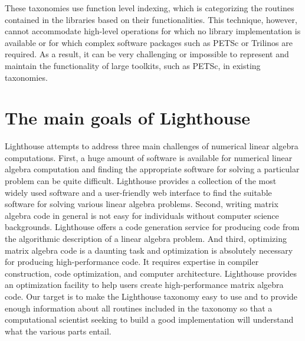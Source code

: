 These taxonomies use function level indexing, which is categorizing the routines contained in the libraries based on their functionalities. This technique, however, cannot accommodate high-level operations for which no library implementation is available or for which complex software packages such as PETSc \cite{petsc} or Trilinos \cite{trilinos} are required. As a result, it can be very challenging or impossible to represent and maintain the functionality of large toolkits, such as PETSc, in existing taxonomies.

\section{The main goals of Lighthouse}
Lighthouse attempts to address three main challenges of numerical linear algebra computations. First, a huge amount of software is available for numerical linear algebra computation and finding the appropriate software for solving a particular problem can be quite difficult. Lighthouse provides a collection of the most widely used software and a user-friendly web interface to find the suitable software for solving various linear algebra problems. Second, writing matrix algebra code in general is not easy for individuals without computer science backgrounds. Lighthouse offers a code generation service for producing code from the algorithmic description of a linear algebra problem. And third, optimizing matrix algebra code is a daunting task and optimization is absolutely necessary for producing high-performance code. It requires expertise in compiler construction, code optimization, and computer architecture. Lighthouse provides an optimization facility to help users create high-performance matrix algebra code. Our target is to make the Lighthouse taxonomy easy to use and to provide enough information about all routines included in the taxonomy so that a computational scientist seeking to build a good implementation will understand what the various parts entail.

